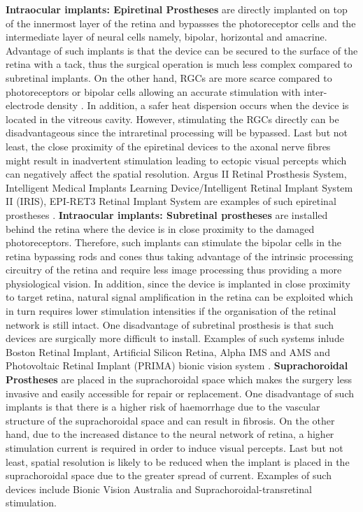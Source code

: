 \textbf{Intraocular implants: Epiretinal Prostheses} are directly implanted on top of the innermost layer of the retina and bypassses the photoreceptor cells and the intermediate layer of neural cells namely, bipolar, horizontal and amacrine. Advantage of such implants is that the device can be secured to the surface of the retina with a tack, thus the surgical operation is much less complex compared to subretinal implants. On the other hand, RGCs are more scarce compared to photoreceptors or bipolar cells allowing an accurate stimulation with inter-electrode density \cite{sekirnjak2008high}. In addition, a safer heat dispersion occurs when the device is located in the vitreous cavity. However, stimulating the RGCs directly can be disadvantageous since the intraretinal processing will be bypassed. Last but not least, the close proximity of the epiretinal devices to the axonal nerve fibres might result in inadvertent stimulation leading to ectopic visual percepts which can negatively affect the spatial resolution. \cite{bloch2019advances} Argus II Retinal Prosthesis System, Intelligent Medical Implants Learning Device/Intelligent Retinal Implant System II (IRIS), EPI-RET3 Retinal Implant System are examples of such epiretinal prostheses \cite{bloch2019advances}. \textbf{Intraocular implants: Subretinal prostheses} are installed behind the retina where the device is in close proximity to the damaged photoreceptors. \cite{zrenner2011subretinal} Therefore, such implants can stimulate the bipolar cells in the retina bypassing rods and cones thus taking advantage of the intrinsic processing circuitry of the retina and require less image processing thus providing a more physiological vision. In addition, since the device is implanted in close proximity to target retina, natural signal amplification in the retina can be exploited which in turn requires lower stimulation intensities if the organisation of the retinal network is still intact. \cite{bloch2019advances} One disadvantage of subretinal prosthesis is that such devices are surgically more difficult to install. Examples of such systems inlude Boston Retinal Implant, Artificial Silicon Retina, Alpha IMS and AMS and Photovoltaic Retinal Implant (PRIMA) bionic vision system \cite{bloch2019advances}. \textbf{Suprachoroidal Prostheses} are placed in the suprachoroidal space which makes the surgery less invasive and easily accessible for repair or replacement. One disadvantage of such implants is that there is a higher risk of haemorrhage due to the vascular structure of the suprachoroidal space and can result in fibrosis. On the other hand, due to the increased distance to the neural network of retina, a higher stimulation current is required in order to induce visual percepts. Last but not least, spatial resolution is likely to be reduced when the implant is placed in the suprachoroidal space due to the greater spread of current. \cite{bloch2019advances} Examples of such devices include Bionic Vision Australia and Suprachoroidal-transretinal stimulation.

